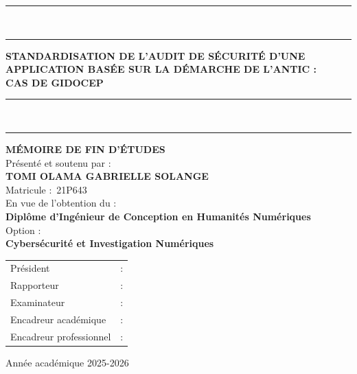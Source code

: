 \documentclass[12pt,a4paper,oneside]{report}
\begin{document}
\begin{titlepage}
\begin{center}
\vspace{0.3cm}
{\color{navy}\rule{\textwidth}{1.5pt}}\\[-2pt]
{\color{gold}\rule{\textwidth}{3pt}}
\vspace{0.25cm}

{\color{navy}\large\bfseries
STANDARDISATION DE L'AUDIT DE S\'ECURIT\'E D'UNE\\[0.3em]
APPLICATION BAS\'EE SUR LA D\'EMARCHE DE L'ANTIC :}\\[0.4cm]
{\color{navy}\Large\bfseries CAS DE GIDOCEP}

\vspace{0.25cm}
{\color{gold}\rule{\textwidth}{3pt}}\\[-2pt]
{\color{navy}\rule{\textwidth}{1.5pt}}

\vspace{0.3cm}
{\large\bfseries\color{navy} M\'EMOIRE DE FIN D'\'ETUDES}\\[0.3cm]
{\small\color{navy} Pr\'esent\'e et soutenu par :}\\[0.15cm]
{\large\bfseries\color{navy} TOMI OLAMA GABRIELLE SOLANGE}\\[0.05cm]
{\small\color{steel} Matricule :~21P643}\\[0.3cm]
{\small\color{navy} En vue de l'obtention du :}\\[0.05cm]
{\small\bfseries\color{navy} Dipl\^ome d'Ing\'enieur de Conception en Humanit\'es Num\'eriques}\\[0.05cm]
{\small\color{navy} Option :}\\[0.05cm]
{\small\bfseries\color{navy} Cybers\'ecurit\'e et Investigation Num\'eriques}

\vspace{0.25cm}
\begin{tcolorbox}[
  enhanced, colback=navy!4, colframe=navy,
  boxrule=1pt, arc=0pt,
  borderline west={3.5pt}{0pt}{gold},
  left=10pt, right=10pt, top=6pt, bottom=6pt,
  title={\bfseries\color{white}\small DEVANT LE JURY COMPOS\'E DE},
  coltitle=white, colbacktitle=navy,
  attach boxed title to top left={xshift=5mm,yshift=-2.5mm},
  boxed title style={sharp corners,boxrule=0pt}]
\small\color{navy}
\begin{tabular}{@{}p{5.5cm}l@{}}
Pr\'esident             & : \dotfill \\[3pt]
Rapporteur              & : \dotfill \\[3pt]
Examinateur             & : \dotfill \\[3pt]
Encadreur acad\'emique    & : \dotfill \\[3pt]
Encadreur professionnel & : \dotfill \\
\end{tabular}
\end{tcolorbox}

\vspace{0.3cm}
{\small\color{navy} Ann\'ee acad\'emique 2025-2026}
\end{center}
\end{titlepage}
\end{document}
